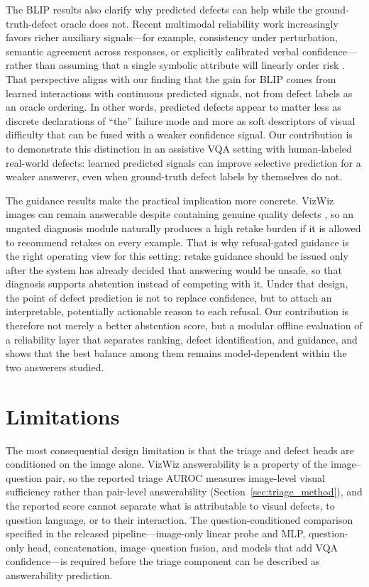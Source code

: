\documentclass{ieeeaccess}
\newcommand{\blip}{BLIP}
\begin{document}
The \blip{} results also clarify why predicted defects can help while the ground-truth-defect oracle does not. Recent multimodal reliability work increasingly favors richer auxiliary signals---for example, consistency under perturbation, semantic agreement across responses, or explicitly calibrated verbal confidence---rather than assuming that a single symbolic attribute will linearly order risk \cite{khan2024consistency,zhang2024vluncertainty,xuan2025seeing}. That perspective aligns with our finding that the gain for \blip{} comes from learned interactions with continuous predicted signals, not from defect labels as an oracle ordering. In other words, predicted defects appear to matter less as discrete declarations of ``the'' failure mode and more as soft descriptors of visual difficulty that can be fused with a weaker confidence signal. Our contribution is to demonstrate this distinction in an assistive VQA setting with human-labeled real-world defects: learned predicted signals can improve selective prediction for a weaker answerer, even when ground-truth defect labels by themselves do not.

The guidance results make the practical implication more concrete. VizWiz images can remain answerable despite containing genuine quality defects \cite{gurari2018vizwiz,chiu2020assessing}, so an ungated diagnosis module naturally produces a high retake burden if it is allowed to recommend retakes on every example. That is why refusal-gated guidance is the right operating view for this setting: retake guidance should be issued only after the system has already decided that answering would be unsafe, so that diagnosis supports abstention instead of competing with it. Under that design, the point of defect prediction is not to replace confidence, but to attach an interpretable, potentially actionable reason to each refusal. Our contribution is therefore not merely a better abstention score, but a modular offline evaluation of a reliability layer that separates ranking, defect identification, and guidance, and shows that the best balance among them remains model-dependent within the two answerers studied.

\section{Limitations}
\label{sec:limitations}

The most consequential design limitation is that the triage and
defect heads are conditioned on the image alone. VizWiz
answerability is a property of the image--question pair, so the
reported triage AUROC measures image-level visual sufficiency
rather than pair-level answerability (Section~\ref{sec:triage_method}),
and the reported score cannot separate what is attributable to
visual defects, to question language, or to their interaction.
The question-conditioned comparison specified in the released
pipeline---image-only linear probe and MLP, question-only head,
concatenation, image--question fusion, and models that add VQA
confidence---is required before the triage component can be
described as answerability prediction.
\end{document}
